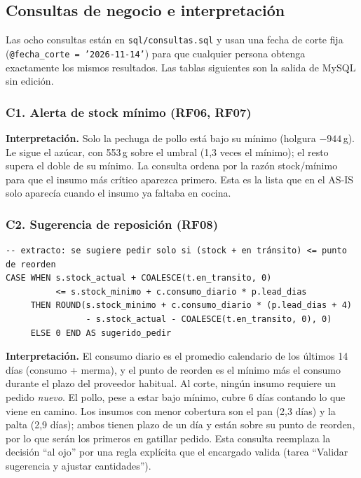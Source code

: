 \documentclass[11pt,letterpaper]{article}
\newcommand{\tablasize}{\footnotesize}
\begin{document}
\subsection{Consultas de negocio e interpretación}
Las ocho consultas están en \texttt{sql/consultas.sql} y usan una fecha de corte fija (\texttt{@fecha\_corte = '2026-11-14'}) para que cualquier persona obtenga exactamente los mismos resultados. Las tablas siguientes son la salida de MySQL sin edición.

\subsubsection*{C1. Alerta de stock mínimo (RF06, RF07)}
\begin{table}[H]\centering\tablasize{}\end{table}
\noindent\textbf{Interpretación.} Solo la pechuga de pollo está bajo su mínimo (holgura $-944$\,g). Le sigue el azúcar, con 553\,g sobre el umbral (1,3 veces el mínimo); el resto supera el doble de su mínimo. La consulta ordena por la razón stock/mínimo para que el insumo más crítico aparezca primero. Esta es la lista que en el AS-IS solo aparecía cuando el insumo ya faltaba en cocina.

\subsubsection*{C2. Sugerencia de reposición (RF08)}
\begin{lstlisting}
-- extracto: se sugiere pedir solo si (stock + en tránsito) <= punto de reorden
CASE WHEN s.stock_actual + COALESCE(t.en_transito, 0)
          <= s.stock_minimo + c.consumo_diario * p.lead_dias
     THEN ROUND(s.stock_minimo + c.consumo_diario * (p.lead_dias + 4)
                - s.stock_actual - COALESCE(t.en_transito, 0), 0)
     ELSE 0 END AS sugerido_pedir
\end{lstlisting}
\begin{table}[H]\centering\tablasize\setlength{\tabcolsep}{4pt}\end{table}
\noindent\textbf{Interpretación.} El consumo diario es el promedio calendario de los últimos 14 días (consumo + merma), y el punto de reorden es el mínimo más el consumo durante el plazo del proveedor habitual. Al corte, ningún insumo requiere un pedido \emph{nuevo}. El pollo, pese a estar bajo mínimo, cubre 6 días contando lo que viene en camino. Los insumos con menor cobertura son el pan (2,3 días) y la palta (2,9 días); ambos tienen plazo de un día y están sobre su punto de reorden, por lo que serán los primeros en gatillar pedido. Esta consulta reemplaza la decisión ``al ojo'' por una regla explícita que el encargado valida (tarea ``Validar sugerencia y ajustar cantidades'').
\end{document}

